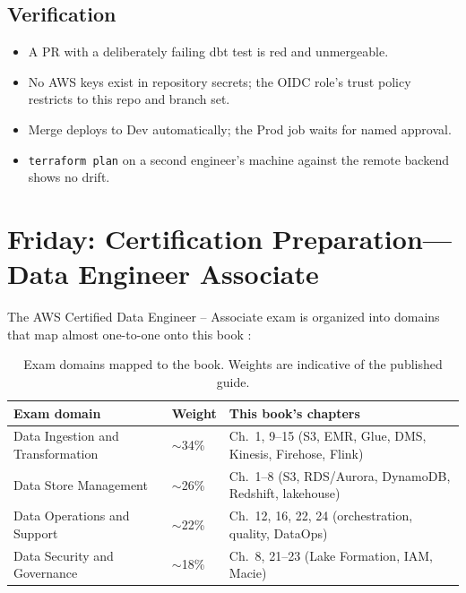 \subsection*{Verification}
\begin{itemize}
    \item A PR with a deliberately failing dbt test is red and unmergeable.
    \item No AWS keys exist in repository secrets; the OIDC role's trust policy restricts to this repo and branch set.
    \item Merge deploys to Dev automatically; the Prod job waits for named approval.
    \item \texttt{terraform plan} on a second engineer's machine against the remote backend shows no drift.
\end{itemize}

\section{Friday: Certification Preparation---Data Engineer Associate}
The AWS Certified Data Engineer -- Associate exam is organized into domains that map almost one-to-one onto this book \cite{awsCertDataEngineer}:

\begin{table}[H]
\centering
\small
\begin{tabular}{@{}p{4.6cm}p{2.2cm}p{5.8cm}@{}}
\toprule
\textbf{Exam domain} & \textbf{Weight} & \textbf{This book's chapters} \\
\midrule
Data Ingestion and Transformation & $\sim$34\% & Ch.\ 1, 9--15 (S3, EMR, Glue, DMS, Kinesis, Firehose, Flink) \\
Data Store Management & $\sim$26\% & Ch.\ 1--8 (S3, RDS/Aurora, DynamoDB, Redshift, lakehouse) \\
Data Operations and Support & $\sim$22\% & Ch.\ 12, 16, 22, 24 (orchestration, quality, DataOps) \\
Data Security and Governance & $\sim$18\% & Ch.\ 8, 21--23 (Lake Formation, IAM, Macie) \\
\bottomrule
\end{tabular}
\caption{Exam domains mapped to the book. Weights are indicative of the published guide.}
\label{tab:ch24-exam-domains}
\end{table}

